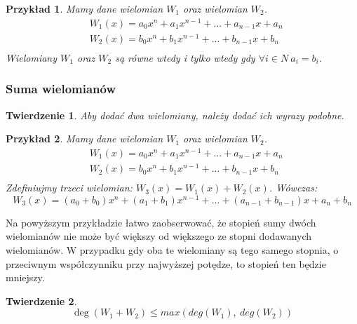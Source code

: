 \documentclass[twoside,a4paper]{book}
\newtheorem{theorem}{Twierdzenie}
\newtheorem{example}{Przykład}
\begin{document}
\begin{example}
	Mamy dane wielomian $W_1$ oraz wielomian $W_2$.
	\begin{equation}
		\begin{split}
			&W_1(x) = a_0x^n + a_1x^{n-1} + ... + a_{n-1}x + a_n \\
			&W_2(x) = b_0x^n + b_1x^{n-1} + ... + b_{n-1}x + b_n \\
		\end{split}
	\end{equation}
	Wielomiany $W_1$ oraz $W_2 $ są równe wtedy i tylko wtedy gdy
	$\forall{i\in N}\ a_i = b_i$.
\end{example}

\subsubsection{Suma wielomianów}

\begin{theorem}
	Aby dodać dwa wielomiany, należy dodać ich wyrazy podobne.
\end{theorem}
\begin{example}
	Mamy dane wielomian $W_1$ oraz wielomian $W_2$.
	\begin{equation}
		\begin{split}
			&W_1(x) = a_0x^n + a_1x^{n-1} + ... + a_{n-1}x + a_n \\
			&W_2(x) = b_0x^n + b_1x^{n-1} + ... + b_{n-1}x + b_n \\
		\end{split}
	\end{equation}
	Zdefiniujmy trzeci wielomian: $W_3(x) = W_1(x) + W_2(x)$. Wówczas:
	\begin{equation}
		W_3(x) = (a_0+b_0)x^n + (a_1+b_1)x^{n-1} + ... + (a_{n-1} + b_{n-1})x + a_n + b_n
	\end{equation}
\end{example}

Na powyższym przykładzie łatwo zaobserwować, że stopień sumy dwóch wielomianów nie może być większy od większego ze stopni dodawanych wielomianów. W przypadku gdy oba te wielomiany są tego samego stopnia, o przeciwnym współczynniku przy najwyższej potędze, to stopień ten będzie mniejszy.

\begin{theorem}
	\begin{equation}
		\deg(W_1 + W_2) \le max(deg(W_1),\ deg (W_2))
	\end{equation}
\end{theorem}
\end{document}
